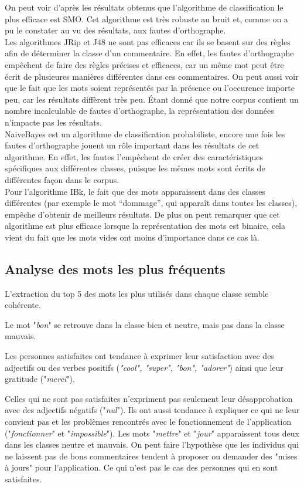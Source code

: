 \documentclass[a4paper, 11pt]{article}
\begin{document}
On peut voir d'après les résultats obtenus que l'algorithme de classification le plus efficace est SMO. Cet algorithme est très robuste au bruit et, comme on a pu le constater au vu des résultats, aux fautes d'orthographe.\\

Les algorithmes JRip et J48 ne sont pas efficaces car ils se basent sur des règles afin de déterminer la classe d'un commentaire. En effet, les fautes d'orthographe empêchent de faire des règles précises et efficaces, car un même mot peut être écrit de plusieures manières différentes dans ces commentaires.
On peut aussi voir que le fait que les mots soient représentés par la présence ou l'occurence importe peu, car les résultats diffèrent très peu. \'{E}tant donné que notre corpus contient un nombre incalculable de fautes d'orthographe, la représentation des données n'impacte pas les résultats.\\

NaiveBayes est un algorithme de classification probabiliste, encore une fois les fautes d'orthographe jouent un rôle important dans les résultats de cet algorithme. En effet, les fautes l'empêchent de créer des caractéristiques spécifiques aux différentes classes, puisque les mêmes mots sont écrits de différentes façon dans le corpus.\\

Pour l'algorithme IBk, le fait que des mots apparaissent dans des classes différentes (par exemple le mot ``dommage'', qui apparaît dans toutes les classes), empêche d'obtenir de meilleurs résultats. De plus on peut remarquer que cet algorithme est plus efficace lorsque la représentation des mots est binaire, cela vient du fait que les mots vides ont moins d'importance dans ce cas là.

\subsection{Analyse des mots les plus fréquents}
L'extraction du top 5 des mots les plus utilisés dans chaque classe semble cohérente.

Le mot "\textit{bon}" se retrouve dans la classe bien et neutre, mais pas dans la classe mauvais.

Les personnes satisfaites ont tendance à exprimer leur satisfaction avec des adjectifs ou des verbes positifs (\textit{"cool", "super", "bon", "adorer"}) ainsi que leur gratitude ("\textit{merci}").  

Celles qui ne sont pas satisfaites n'expriment pas seulement leur désapprobation avec des adjectifs négatifs ("\textit{nul}"). Ils ont aussi tendance à expliquer ce qui ne leur convient pas et les problèmes rencontrés avec le fonctionnement de l'application ("\textit{fonctionner}" et "\textit{impossible}"). Les mots "\textit{mettre}" et "\textit{jour}" apparaissent tous deux dans les classes neutre et mauvais. On peut faire l'hypothèse que les individus qui ne laissent pas de bons commentaires tendent à proposer ou demander des "mises à jours" pour l'application. Ce qui n'est pas le cas des personnes qui en sont satisfaites.\\
\end{document}
